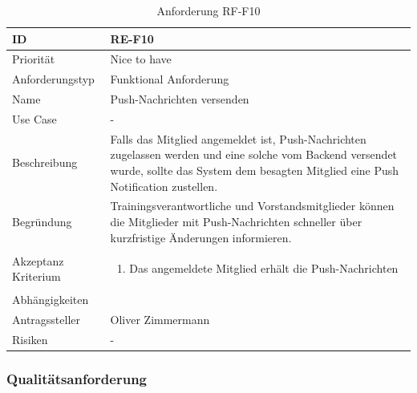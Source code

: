 \begin{table}[ht]
\centering
  \begin{tabular}{ l | p{8cm} }
	\hline
	\rowcolor{gray}
	ID 			&	\textbf{RE-F10}\\ \hline
	Priorität 		&	Nice to have\\ \hline
	Anforderungstyp	&	Funktional Anforderung\\ \hline
	Name 			&	Push-Nachrichten versenden\\ \hline
	Use Case 		&	-\\ \hline
	Beschreibung 	&	Falls das Mitglied angemeldet ist, Push-Nachrichten zugelassen werden und eine solche vom Backend versendet wurde, sollte das System dem besagten Mitglied eine Push Notification zustellen.\\ \hline
	Begründung 		&	Trainingsverantwortliche und Vorstandsmitglieder können die Mitglieder mit Push-Nachrichten schneller über kurzfristige Änderungen informieren.\\ \hline
	Akzeptanz Kriterium	&	\begin{enumerate}
					\item Das angemeldete Mitglied erhält die Push-Nachrichten
					\end{enumerate}
					\\ \hline
	Abhängigkeiten 	&	\nameref{table:req_1}\\ \hline
	Antragssteller 	&	Oliver Zimmermann\\ \hline
	Risiken	 	&	-
  \end{tabular}
   \caption{Anforderung RF-F10}\label{table:req_10}
\end{table}

\newpage
\FloatBarrier
\subsubsection{Qualitätsanforderung}\label{non_func_anforderungen}

